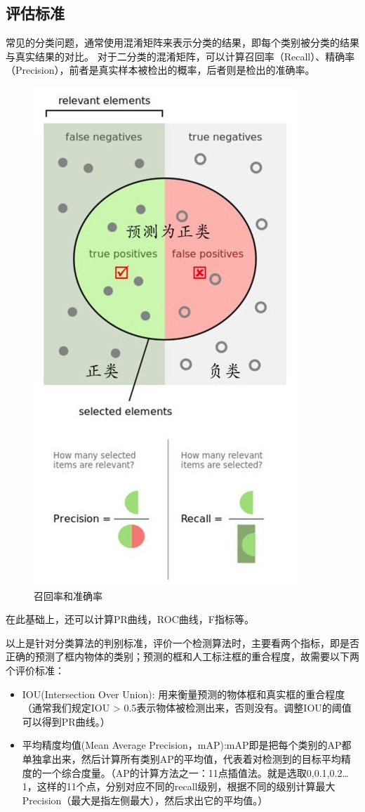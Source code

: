 \documentclass[a4paper, notitlepage]{article}
\begin{document}
\subsection{评估标准}
常见的分类问题，通常使用混淆矩阵来表示分类的结果，即每个类别被分类的结果与真实结果的对比。
对于二分类的混淆矩阵，可以计算召回率（Recall）、精确率（Precision），前者是真实样本被检出的概率，后者则是检出的准确率。
\begin{figure}[H]
    \centering
    \includegraphics[scale=0.4]{fig_precision_recall}
    \caption{召回率和准确率}
    \label{fig:example}
\end{figure}
在此基础上，还可以计算PR曲线，ROC曲线，F指标等。

以上是针对分类算法的判别标准，评价一个检测算法时，主要看两个指标，即是否正确的预测了框内物体的类别；预测的框和人工标注框的重合程度，故需要以下两个评价标准：
\begin{itemize}
	\item IOU(Intersection Over Union): 用来衡量预测的物体框和真实框的重合程度（通常我们规定IOU > 0.5表示物体被检测出来，否则没有。调整IOU的阈值可以得到PR曲线。）
	\item 平均精度均值(Mean Average Precision，mAP):mAP即是把每个类别的AP都单独拿出来，然后计算所有类别AP的平均值，代表着对检测到的目标平均精度的一个综合度量。（AP的计算方法之一：11点插值法。就是选取0,0.1,0.2…1，这样的11个点，分别对应不同的recall级别，根据不同的级别计算最大Precision（最大是指左侧最大），然后求出它的平均值。）
\end{itemize}
\end{document}
